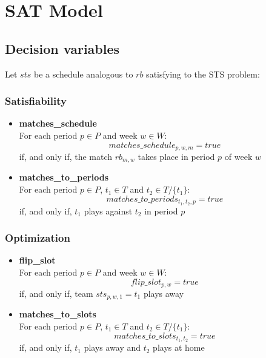 \section{SAT Model}
\subsection{Decision variables}
Let $sts$ be a schedule analogous to $rb$ satisfying to the STS problem:

\subsubsection{Satisfiability}
\begin{itemize}
    \item \textbf{matches\_schedule}\\
        For each period $p \in P$ and week $w \in W$:
        $$
        matches\_schedule_{p, w, m} = true
        $$
        if, and only if, the match $rb_{m, w}$ takes place in period $p$ of week $w$
    \item \textbf{matches\_to\_periods}\\
        For each period $p \in P$, $t_1 \in T$ and $t_2 \in T/\{t_1\}$:
        $$
        matches\_to\_periods_{t_1, t_2, p} = true
        $$
        if, and only if, $t_1$ plays against $t_2$ in period $p$
\end{itemize}
\subsubsection{Optimization}
\begin{itemize}
    \item \textbf{flip\_slot}\\
        For each period $p \in P$ and week $w \in W$:
        $$
        flip\_slot_{p, w} = true
        $$
        if, and only if, team $sts_{p, w, 1} = t_1$ plays away
    \item \textbf{matches\_to\_slots}\\
        For each period $p \in P$, $t_1 \in T$ and $t_2 \in T/\{t_1\}$:
        $$
        matches\_to\_slots_{t_1, t_2} = true
        $$
        if, and only if, $t_1$ plays away and $t_2$ plays at home
\end{itemize}


